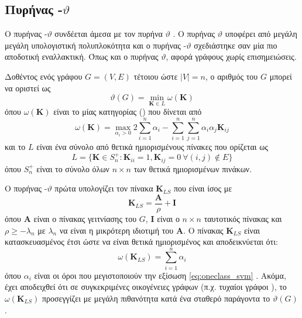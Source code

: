 \subsection{Πυρήνας -$\vartheta$}

Ο πυρήνας -$\vartheta$ συνδέεται άμεσα με τον πυρήνα  $\vartheta$ \cite{johansson2014global}.
Ο πυρήνας  $\vartheta$ υποφέρει από μεγάλη μεγάλη υπολογιστική πολυπλοκότητα και ο πυρήνας -$\vartheta$ σχεδιάστηκε σαν μία πιο αποδοτική εναλλακτική. 
Όπως και ο πυρήνας  $\vartheta$, αφορά γράφους χωρίς επισημειώσεις.

Δοθέντος ενός γράφου $G=(V,E)$ τέτοιου ώστε $|V| = n$, ο αριθμός  του $G$ μπορεί να οριστεί ως
\begin{equation}
    \vartheta(G) = \min_{\mathbf{K} \in L} \omega(\mathbf{K})
\end{equation}
όπου $\omega(\mathbf{K})$ είναι το  μίας κατηγορίας () που δίνεται από
\begin{equation}
    \label{eq:oneclass_svm}
    \omega(\mathbf{K}) = \max_{\alpha_i > 0} 2\sum_{i=1}^{n} \alpha_i - \sum_{i=1}^{n} \sum_{j=1}^{n} \alpha_i \alpha_j \mathbf{K}_{ij}
\end{equation}
και το $L$ είναι ένα σύνολο από θετικά ημιορισμένους πίνακες που ορίζεται ως
\begin{equation}
    L = \{ \mathbf{K} \in S_{n}^+ : \mathbf{K}_{ii} = 1, \mathbf{K}_{ij}=0 \: \forall (i,j) \not \in E \}
\end{equation}
όπου $S_{n}^+$ είναι το σύνολο όλων $n \times n$ των θετικά ημιορισμένων πινάκων.

Ο πυρήνας -$\vartheta$ πρώτα υπολογίζει τον πίνακα $\mathbf{K}_{LS}$ που είναι ίσος με
\begin{equation}
    \mathbf{K}_{LS} = \frac{\mathbf{A}}{\rho} + \mathbf{I}
\end{equation}
όπου $\mathbf{A}$ είναι ο πίνακας γειτνίασης του $G$, $\mathbf{I}$ είναι ο $n \times n$ ταυτοτικός πίνακας και $\rho \geq -\lambda_n$ με $\lambda_n$ να είναι η μικρότερη ιδιοτιμή του $\mathbf{A}$.
Ο πίνακας $\mathbf{K}_{LS}$ είναι κατασκευασμένος έτσι ώστε να είναι θετικά ημιορισμένος και αποδεικνύεται ότι: 
\begin{equation}
    \omega(\mathbf{K}_{LS}) = \sum_{i=1}^n \alpha_i
\end{equation}
όπου $\alpha_i$ είναι οι όροι που μεγιστοποιούν την εξίσωση \ref{eq:oneclass_svm} \cite{jethava2013lovasz}.
Ακόμα, έχει αποδειχθεί ότι σε συγκεκριμένες οικογένειες γράφων (π.χ. τυχαίοι γράφοι ), το  $\omega(\mathbf{K}_{LS})$ προσεγγίζει με μεγάλη πιθανότητα κατά ένα σταθερό παράγοντα το $\vartheta(G)$.

